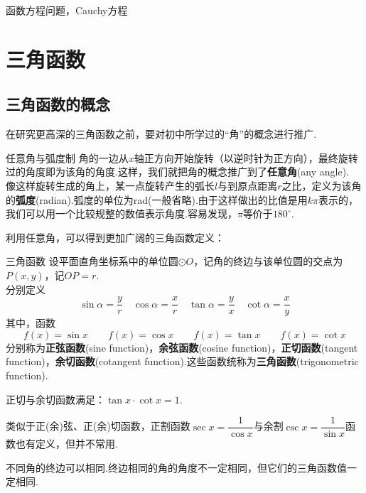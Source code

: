 \documentclass[lang=cn, zihao=5]{elegantbook}
\begin{document}
函数方程问题，Cauchy方程

\chapter{三角函数}

\section{三角函数的概念}

在研究更高深的三角函数之前，要对初中所学过的“角”的概念进行推广.

\begin{definition}{任意角与弧度制} %
    角的一边从$x$轴正方向开始旋转（以逆时针为正方向），最终旋转过的角度即为该角的角度.这样，我们就把角的概念推广到了\textbf{任意角}(any angle).\\
    像这样旋转生成的角上，某一点旋转产生的弧长$l$与到原点距离$r$之比，定义为该角的\textbf{弧度}(radian).弧度的单位为rad(一般省略).由于这样做出的比值是用$k \pi$表示的，我们可以用一个比较规整的数值表示角度.容易发现，$\pi$等价于$180^{\circ}$.
\end{definition}

利用任意角，可以得到更加广阔的三角函数定义：

\begin{definition}{三角函数} %
    设平面直角坐标系中的单位圆$\odot O$，记角的终边与该单位圆的交点为$P(x,y)$，记$OP=r$.\\
    分别定义$$\sin{\alpha}=\frac{y}{r} \quad \cos{\alpha}=\frac{x}{r} \quad \tan{\alpha}=\frac{y}{x} \quad \cot{\alpha}=\frac{x}{y}$$
    其中，函数$$f(x)=\sin{x} \qquad f(x)=\cos{x} \qquad f(x)=\tan{x} \qquad f(x)=\cot{x}$$
    分别称为\textbf{正弦函数}(sine function)，\textbf{余弦函数}(cosine function)，\textbf{正切函数}(tangent function)，\textbf{余切函数}(cotangent function).这些函数统称为\textbf{三角函数}(trigonometric function).
\end{definition}
\begin{remark}
    正切与余切函数满足：$\tan{x} \cdot \cot{x} = 1$.
\end{remark}
\begin{remark}
    类似于正(余)弦、正(余)切函数，正割函数$\sec{x}=\dfrac{1}{\cos{x}}$与余割$\csc{x}=\dfrac{1}{\sin{x}}$函数也有定义，但并不常用.
\end{remark}
\begin{remark}
    不同角的终边可以相同.终边相同的角的角度不一定相同，但它们的三角函数值一定相同.
\end{remark}
\end{document}
